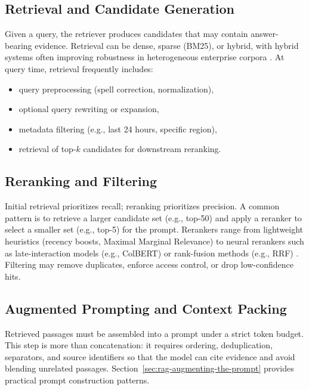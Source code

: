 \subsection{Retrieval and Candidate Generation}
Given a query, the retriever produces candidates that may contain answer-bearing evidence. Retrieval can be dense, sparse (BM25), or hybrid, with hybrid systems often improving robustness in heterogeneous enterprise corpora \cite{Thakur2021BEIR,Lin2021SPLADE}. At query time, retrieval frequently includes:
\begin{itemize}
    \item query preprocessing (spell correction, normalization),
    \item optional query rewriting or expansion,
    \item metadata filtering (e.g., last 24 hours, specific region),
    \item retrieval of top-$k$ candidates for downstream reranking.
\end{itemize}

\subsection{Reranking and Filtering}
Initial retrieval prioritizes recall; reranking prioritizes precision. A common pattern is to retrieve a larger candidate set (e.g., top-50) and apply a reranker to select a smaller set (e.g., top-5) for the prompt. Rerankers range from lightweight heuristics (recency boosts, Maximal Marginal Relevance) to neural rerankers such as late-interaction models (e.g., ColBERT) \cite{khattab2020colbert,Zhan2021ColBERTv2} or rank-fusion methods (e.g., RRF) \cite{cormack2009rrf}. Filtering may remove duplicates, enforce access control, or drop low-confidence hits.

\subsection{Augmented Prompting and Context Packing}
Retrieved passages must be assembled into a prompt under a strict token budget. This step is more than concatenation: it requires ordering, deduplication, separators, and source identifiers so that the model can cite evidence and avoid blending unrelated passages. Section~\ref{sec:rag-augmenting-the-prompt} provides practical prompt construction patterns.

